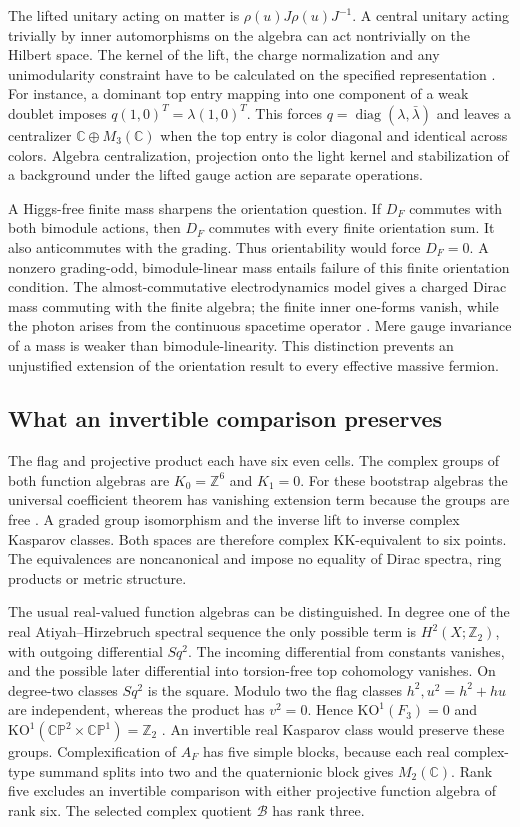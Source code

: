 \documentclass[11pt,oneside]{article}
\newcommand{\C}{\mathbb C}
\newcommand{\Z}{\mathbb Z}
\newcommand{\CP}{\mathbb{CP}}
\newcommand{\KO}{\mathrm{KO}}
\newcommand{\KK}{\mathrm{KK}}
\begin{document}
The lifted unitary acting on matter is \(\rho(u)J\rho(u)J^{-1}\). A central unitary acting trivially by inner automorphisms on the algebra can act nontrivially on the Hilbert space. The kernel of the lift, the charge normalization and any unimodularity constraint have to be calculated on the specified representation \cite{almost}. For instance, a dominant top entry mapping into one component of a weak doublet imposes \(q(1,0)^T=\lambda(1,0)^T\). This forces \(q=\operatorname{diag}(\lambda,\bar\lambda)\) and leaves a centralizer \(\C\oplus M_3(\C)\) when the top entry is color diagonal and identical across colors. Algebra centralization, projection onto the light kernel and stabilization of a background under the lifted gauge action are separate operations.

A Higgs-free finite mass sharpens the orientation question. If \(D_F\) commutes with both bimodule actions, then \(D_F\) commutes with every finite orientation sum. It also anticommutes with the grading. Thus orientability would force \(D_F=0\). A nonzero grading-odd, bimodule-linear mass entails failure of this finite orientation condition. The almost-commutative electrodynamics model gives a charged Dirac mass commuting with the finite algebra; the finite inner one-forms vanish, while the photon arises from the continuous spacetime operator \cite{almost}. Mere gauge invariance of a mass is weaker than bimodule-linearity. This distinction prevents an unjustified extension of the orientation result to every effective massive fermion.

\subsection*{What an invertible comparison preserves}
The flag and projective product each have six even cells. The complex groups of both function algebras are \(K_0=\Z^6\) and \(K_1=0\). For these bootstrap algebras the universal coefficient theorem has vanishing extension term because the groups are free \cite{uct}. A graded group isomorphism and the inverse lift to inverse complex Kasparov classes. Both spaces are therefore complex \(\KK\)-equivalent to six points. The equivalences are noncanonical and impose no equality of Dirac spectra, ring products or metric structure.

The usual real-valued function algebras can be distinguished. In degree one of the real Atiyah--Hirzebruch spectral sequence the only possible term is \(H^2(X;\Z_2)\), with outgoing differential \(Sq^2\). The incoming differential from constants vanishes, and the possible later differential into torsion-free top cohomology vanishes. On degree-two classes \(Sq^2\) is the square. Modulo two the flag classes \(h^2,u^2=h^2+hu\) are independent, whereas the product has \(v^2=0\). Hence \(\KO^1(F_3)=0\) and \(\KO^1(\CP^2\times\CP^1)=\Z_2\) \cite{zib}. An invertible real Kasparov class would preserve these groups. Complexification of \(A_F\) has five simple blocks, because each real complex-type summand splits into two and the quaternionic block gives \(M_2(\C)\). Rank five excludes an invertible comparison with either projective function algebra of rank six. The selected complex quotient \(\mathcal B\) has rank three.
\end{document}
